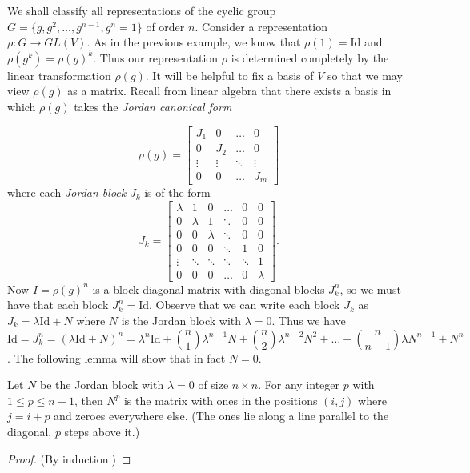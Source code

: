 \begin{example}
We shall classify all representations of the cyclic group $G = \{ g, g^2, \ldots, g^{n-1}, g^n=1\}$ of order $n$. Consider a representation $\rho \colon G \to GL(V)$.  As in the previous example, we know that $\rho(1) = \text{Id}$ and $\rho(g^k) = \rho(g)^k$.  Thus our representation $\rho$ is determined completely by the linear transformation $\rho(g)$.   It will be helpful to fix a basis of $V$ so that we may view $\rho(g)$ as a matrix.  Recall from linear algebra that there exists a basis in which $\rho(g)$ takes the \textit{Jordan canonical form}

\[ \rho(g) = \begin{bmatrix}
    J_1 & 0 & \dots  &0 \\
  0 & J_2  & \dots & 0 \\
    \vdots & \vdots  & \ddots & \vdots \\
    0& 0&  \dots  & J_m
\end{bmatrix} \]
where each \textit{Jordan block} $J_k$ is of the form 
\[J_k =  \begin{bmatrix}
    \lambda & 1&0& \dots  &0 & 0 \\
     0 &\lambda& 1& \ddots & 0  & 0 \\
     0 & 0 & \lambda & \ddots& 0  & 0 \\
     0 & 0 & 0 & \ddots & 1 & 0 \\
    \vdots & \ddots & \ddots & \ddots & \ddots  & 1\\
    0& 0& 0 & \dots  & 0  &\lambda
\end{bmatrix}. \]
Now $I = \rho(g)^n$ is a block-diagonal matrix with diagonal blocks $J_k^n$, so we must have that each block $J_k^n=\text{Id}$.  Observe that we can write each block $J_k$ as $J_k = \lambda \text{Id} + N$ where $N$ is the Jordan block with $\lambda = 0$.  Thus we have 
\[ \text{Id} = J_k^n = (\lambda \text{Id} + N)^n = \lambda ^n \text{Id} + \binom{n}{1} \lambda ^{n -1} N + \binom{n}{2} \lambda ^{n-2} N^2 + \ldots + \binom {n} {n -1} \lambda N^{n -1} + N^n \]. The following lemma will show that in fact $N=0$. 
\begin{lemma}
Let $N$ be the Jordan block with $\lambda = 0$ of size $n \times n$.  For any integer $p$ with $1 \leq p \leq n - 1$, then $N^p$ is the matrix with ones in the positions $(i,j)$ where $j = i + p$ and zeroes everywhere else.  (The ones lie along a line parallel to the diagonal, $p$ steps above it.)

\begin{proof}
(By induction.)


\end{proof}
\end{lemma}
\end{example}
